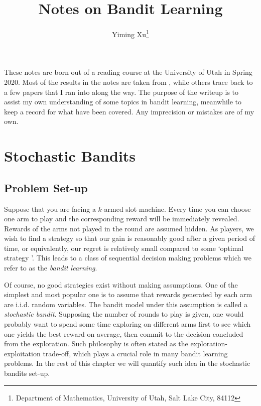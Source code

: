 \documentclass[letterpaper,11pt,openright,openany]{book}
\numberwithin{equation}{section}
\theoremstyle{plain}
\theoremstyle{definition}
\begin{document}
\title{Notes on Bandit Learning}
\date{}
\author{Yiming Xu\thanks{Department of Mathematics, University of Utah, Salt Lake City, 84112 }}
\maketitle

\vspace*{\fill}
These notes are born out of a reading course at the University of Utah in Spring 2020. Most of the results in the notes are taken from \cite{lattimore2018bandit}, while others trace back to a few papers that I ran into along the way. The purpose of the writeup is to assist my own understanding of some topics in bandit learning, meanwhile to keep a record for what have been covered. Any imprecision or mistakes are of my own. 
\vspace*{\fill}

\bigskip

\bigskip

\bigskip

\tableofcontents
\newpage

\chapter{Stochastic Bandits}\label{sec1}

\section{Problem Set-up}\label{bg}

Suppose that you are facing a $k$-armed slot machine. Every time you can choose one arm to play and the corresponding reward will be immediately revealed. Rewards of the arms not played in the round are assumed hidden. As players, we wish to find a strategy so that our gain is reasonably good after a given period of time, or equivalently, our regret is relatively small compared to some `optimal strategy '. This leads to a class of sequential decision making problems which we refer to as the \emph{bandit learning}.  

Of course, no good strategies exist without making assumptions. One of the simplest and most popular one is to assume that rewards generated by each arm are i.i.d. random variables. The bandit model under this assumption is called a \emph{stochastic bandit}. Supposing the number of rounds to play is given, one would probably want to spend some time exploring on different arms first to see which one yields the best reward on average, then commit to the decision concluded from the exploration. Such philosophy is often stated as the exploration-exploitation trade-off, which plays a crucial role in many bandit learning problems. In the rest of this chapter we will quantify such idea in the stochastic bandits set-up. 
\end{document}
